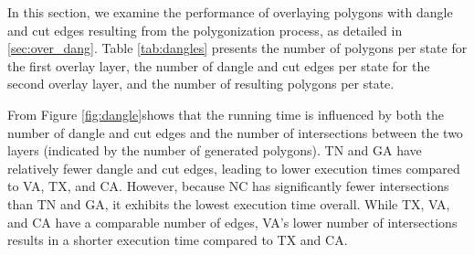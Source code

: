 In this section, we examine the performance of overlaying polygons with dangle and cut edges resulting from the polygonization process, as detailed in \ref{sec:over_dang}.  Table \ref{tab:dangles} presents the number of polygons per state for the first overlay layer, the number of dangle and cut edges per state for the second overlay layer, and the number of resulting polygons per state.

From Figure \ref{fig:dangle}shows that the running time is influenced by both the number of dangle and cut edges and the number of intersections between the two layers (indicated by the number of generated polygons). TN and GA have relatively fewer dangle and cut edges, leading to lower execution times compared to VA, TX, and CA. However, because NC has significantly fewer intersections than TN and GA, it exhibits the lowest execution time overall. While TX, VA, and CA have a comparable number of edges, VA’s lower number of intersections results in a shorter execution time compared to TX and CA.
